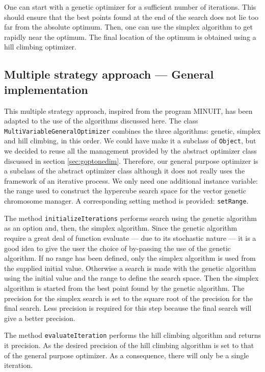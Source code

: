 \documentclass[twoside]{book}
\begin{document}
One can start with a genetic optimizer for a sufficient number of
iterations. This should ensure that the best points found at the
end of the search does not lie too far from the absolute optimum.
Then, one can use the simplex algorithm to get rapidly near the
optimum. The final location of the optimum is obtained using a
hill climbing optimizer.

\subsection{Multiple strategy approach --- General implementation}
This multiple strategy approach, inspired from the program MINUIT,
has been adapted to the use of the algorithms discussed here. The
class {\tt MultiVariableGeneralOptimizer} combines the three
algorithms: genetic, simplex and hill climbing, in this order. We
could have make it a subclass of {\tt Object}, but we decided to
reuse all the management provided by the abstract optimizer class
discussed in section \ref{sec:goptonedim}. Therefore, our general
purpose optimizer is a subclass of the abstract optimizer class
although it does not really uses the framework of an iterative
process. We only need one additional instance variable: the range
used to construct the hypercube search space for the vector
genetic chromosome manager. A corresponding setting method is
provided: {\tt setRange}.

The method {\tt initializeIterations} performs search using the
genetic algorithm as an option and, then, the simplex algorithm.
Since the genetic algorithm require a great deal of function
evaluate --- due to its stochastic nature --- it is a good idea to
give the user the choice of by-passing the use of the genetic
algorithm. If no range has been defined, only the simplex
algorithm is used from the supplied initial value. Otherwise a
search is made with the genetic algorithm using the initial value
and the range to define the search space. Then the simplex
algorithm is started from the best point found by the genetic
algorithm. The precision for the simplex search is set to the
square root of the precision for the final search. Less precision
is required for this step because the final search will give a
better precision.

The method {\tt evaluateIteration} performs the hill climbing
algorithm and returns it precision. As the desired precision of
the hill climbing algorithm is set to that of the general purpose
optimizer. As a consequence, there will only be a single
iteration.
\end{document}
